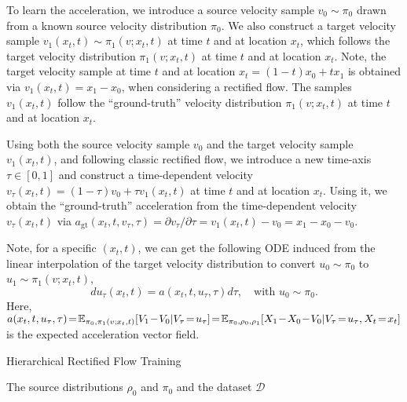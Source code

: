 To learn the acceleration, we introduce a source velocity sample $v_0\sim\pi_0$ drawn from a known source velocity distribution $\pi_0$. We also construct a target velocity sample $v_1(x_t,t)\sim \pi_1(v; x_t, t)$ at time $t$ and at location $x_t$, which follows the target velocity distribution $ \pi_1(v; x_t, t)$ at time $t$ and at location $x_t$. Note, the target velocity sample at time $t$ and at location $x_t = (1-t)x_0 + tx_1$ is obtained via $v_1(x_t,t) = x_1 - x_0$, when considering a rectified flow. The samples $v_1(x_t,t)$ follow the ``ground-truth'' velocity distribution $\pi_1(v; x_t, t)$ at time $t$ and at location $x_t$.

Using both the source velocity sample $v_0$ and the target velocity sample $v_1(x_t,t)$, and following classic rectified flow, we introduce a new time-axis $\tau\in[0,1]$ and construct a time-dependent velocity $v_\tau(x_t,t) = (1-\tau)v_0 + \tau v_1(x_t,t)$ at time $t$ and at location $x_t$. Using it, we obtain the ``ground-truth'' acceleration from the time-dependent velocity $v_\tau(x_t,t)$ via $a_{\mathrm{gt}}(x_t,t,v_\tau,\tau) = \partial v_\tau/\partial \tau = v_1(x_t,t) - v_0 = x_1 - x_0 - v_0$. 

Note, for a specific $(x_t, t)$, we can get the following ODE induced from the linear interpolation of the target velocity distribution to convert $u_0 \sim \pi_0$ to $u_1 \sim \pi_1(v; x_t, t)$, %
\begin{equation}
\label{eq:udiffeq}
   du_\tau(x_t, t) = a (x_t, t, u_\tau, \tau) d\tau, \quad \text{with } u_0 \sim \pi_0.
\end{equation}
Here, $a (x_t, t, u_\tau, \tau)\! =\! \E_{\pi_0, \pi_1(v; x_t, t)}[ V_1 \!-\! V_0 | V_\tau \!= \! u_\tau ] \!=\! \E_{\pi_0, \rho_0, \rho_1}[ X_1 \!- \!X_0 \!-\! V_0 | V_\tau \! = \! u_\tau , X_t \!=\! x_t]$ is the expected acceleration vector field.


\begin{algorithm}[t]
\caption{Hierarchical Rectified Flow Training}\label{alg:training}
 The source distributions $\rho_0$ and $\pi_0$ and the dataset $\mathcal{D}$ \\
\end{algorithm}

